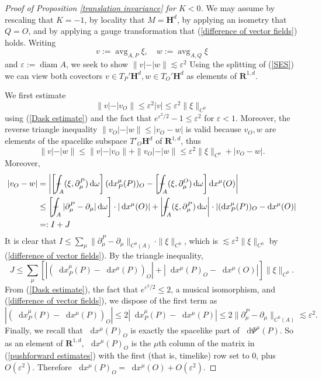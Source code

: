 \documentclass[reqno,11pt]{amsart}
\newcommand{\RR}{\mathbf{R}}
\newcommand{\Hyp}{\mathbf H}
\DeclareMathOperator{\avg}{avg}
\DeclareMathOperator{\diam}{diam}
\newcommand*\dif{\mathop{}\!\mathrm{d}}
\theoremstyle{definition}
\numberwithin{equation}{section}
\def\Xint#1{\mathchoice
{\XXint\displaystyle\textstyle{#1}}%
{\XXint\textstyle\scriptstyle{#1}}%
{\XXint\scriptstyle\scriptscriptstyle{#1}}%
{\XXint\scriptscriptstyle\scriptscriptstyle{#1}}%
\!\int}
\def\XXint#1#2#3{{\setbox0=\hbox{$#1{#2#3}{\int}$ }
\vcenter{\hbox{$#2#3$ }}\kern-.6\wd0}}
\def\dashint{\Xint-}
\begin{document}
\begin{proof}[Proof of Proposition \ref{translation invariance} for $K < 0$]
We may assume by rescaling that $K = -1$, by locality that $M = \Hyp^d$, by applying an isometry that $Q = O$, and by applying a gauge transformation that (\ref{difference of vector fields}) holds.
Writing
$$v := \avg_{A, P} \xi, \quad w := \avg_{A, Q} \xi$$
and $\varepsilon := \diam A$, we seek to show $\|v| - |w\| \lesssim \varepsilon^2$
Using the splitting of (\ref{SES}) we can view both covectors $v \in T_P' \Hyp^d, w \in T_O' \Hyp^d$ as elements of $\RR^{1, d}$.

We first estimate
$$\|v| - |v_O\| \leq \varepsilon^2 |v| \leq \varepsilon^2 \|\xi\|_{C^0}$$
using (\ref{Dask estimate}) and the fact that $e^{\varepsilon^2/2} - 1 \leq \varepsilon^2$ for $\varepsilon < 1$.
Moreover, the reverse triangle inequality $\|v_O| - |w\| \leq |v_O - w|$ is valid because $v_O, w$ are elements of the spacelike subspace $T'_O \Hyp^d$ of $\RR^{1, d}$, thus
$$\|v| - |w\| \leq \|v| - |v_O\| + \|v_O| - |w\| \leq \varepsilon^2 \|\xi\|_{C^0} + |v_O - w|.$$
Moreover,
\begin{align*}
|v_O - w| &= \left|\left[\dashint_A (\xi, \partial^P_\mu) \dif \omega\right] (\dif x_P^\mu(P))_O - \left[\dashint_A (\xi, \partial^O_\mu) \dif \omega\right] \dif x^\mu(O)\right| \\
&\leq \left[\dashint_A |\partial^P_\mu - \partial_\mu| \dif \omega\right] \cdot |\dif x^\mu(O)| + \left|\dashint_A (\xi, \partial_\mu^P) \dif \omega\right| \cdot |(\dif x^\mu_P(P))_O - \dif x^\mu(O)|\\
&=: I + J
\end{align*}
It is clear that $I \leq \sum_\mu \|\partial^P_\mu - \partial_\mu\|_{C^0(A)} \cdot \|\xi\|_{C^0}$, which is $\lesssim \varepsilon^2 \|\xi\|_{C^0}$ by (\ref{difference of vector fields}).
By the triangle inequality,
$$J \leq \sum_\mu \left[|(\dif x^\mu_P(P) - \dif x^\mu(P))_O| + |\dif x^\mu(P)_O - \dif x^\mu(O)|\right] \|\xi\|_{C^0}.$$
From (\ref{Dask estimate}), the fact that $e^{\varepsilon^2/2} \leq 2$, a musical isomorphism, and (\ref{difference of vector fields}), we dispose of the first term as
$$|(\dif x^\mu_P(P) - \dif x^\mu(P))_O| \leq 2 |\dif x^\mu_P(P) - \dif x^\mu(P)| \leq 2 \|\partial^P_\mu - \partial_\mu\|_{C^0(A)} \lesssim \varepsilon^2.$$
Finally, we recall that $\dif x^\mu(P)_O$ is exactly the spacelike part of $\dif \Psi^\mu(P)$.
So as an element of $\RR^{1, d}$, $\dif x^\mu(P)_O$ is the $\mu$th column of the matrix in (\ref{pushforward estimates}) with the first (that is, timelike) row set to $0$, plus $O(\varepsilon^2)$.
Therefore $\dif x^\mu(P)_O = \dif x^\mu(O) + O(\varepsilon^2)$.
\end{proof}
\end{document}
